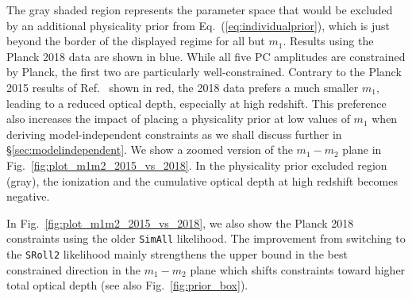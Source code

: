 \documentclass[prd,twocolumn,amsmath,amssymb,floatfix,superscriptaddress,nofootinbib]{revtex4-1}
\newcommand{\wh}[1]{\textcolor{blue}{#1}}
\begin{document}
%
%
%
%
The gray shaded region %
represents the parameter space that would be excluded by an additional 
physicality prior from Eq.~(\ref{eq:individualprior}),
which is just beyond the border of the displayed regime for all but $m_1$. Results using the Planck 2018 data are shown in blue. While all five PC amplitudes are  constrained by Planck, the first two are particularly well-constrained. Contrary to the Planck 2015 results of Ref.~\cite{Heinrich:2016ojb} shown in red, the 2018 data prefers a much smaller $m_1$, leading to a reduced optical depth, especially at high redshift.  
This preference also increases the impact of placing a physicality prior at low values of $m_1$ when deriving model-independent constraints as we shall discuss further in \S \ref{sec:modelindependent}.
We show a zoomed version of the $m_1-m_2$ plane in Fig.~\ref{fig:plot_m1m2_2015_vs_2018}.
In the physicality prior excluded region (gray), the ionization and the cumulative optical depth at high redshift becomes negative.

In Fig.~\ref{fig:plot_m1m2_2015_vs_2018}, we also show
the Planck 2018 constraints using the older \texttt{SimAll} likelihood.  The improvement 
from switching to the \texttt{SRoll2} likelihood mainly strengthens the upper bound in the best constrained direction in the $m_1-m_2$ plane which shifts constraints toward higher total optical depth (see also Fig.~\ref{fig:prior_box}).




\end{document}
